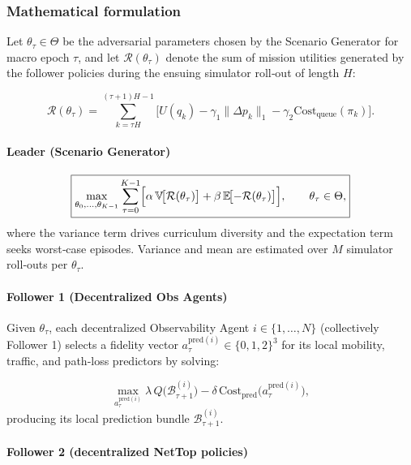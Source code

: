 \documentclass[doc.tex]{subfiles}
\begin{document}
\subsubsection{Mathematical formulation}

Let \(\theta_\tau\in\Theta\) be the adversarial parameters chosen by the
Scenario Generator for macro epoch \(\tau\), and let  \(\mathcal{R}(\theta_\tau)\) denote the sum of mission utilities
generated by the follower policies during the ensuing simulator
roll‑out of length \(H\):

\[
  \mathcal{R}(\theta_\tau)=\sum_{k=\tau H}^{(\tau+1)H-1}\bigl[U(q_k)-\gamma_1\|\Delta p_k\|_1-\gamma_2 \mathrm{Cost}_{\text{queue}}(\pi_k)\bigr].
\]

\vspace{0.4em}
\paragraph{Leader (Scenario Generator)}

\[
\boxed{
  \max_{\theta_0,\dots,\theta_{K-1}}
      \sum_{\tau=0}^{K-1}
        \Bigl[
          \alpha\,\mathbb{V}\!\bigl[\mathcal{R}(\theta_\tau)\bigr]
          +\beta\,\mathbb{E}\!\bigl[-\mathcal{R}(\theta_\tau)\bigr]
        \Bigr],
  \qquad
  \theta_\tau\in\Theta,
}
\]
where the variance term drives curriculum diversity and the expectation
term seeks worst‑case episodes. Variance and mean are estimated over \(M\) simulator roll‑outs per \(\theta_\tau\).

\vspace{0.4em}
\paragraph{Follower 1 (Decentralized Obs Agents)} 

Given \(\theta_\tau\), each decentralized Observability Agent $i \in \{1, \dots, N\}$ (collectively Follower 1) selects a fidelity vector
\(a_\tau^{\text{pred}(i)}\in\{0,1,2\}^3\) for its local mobility, traffic, and
path‑loss predictors by solving: 

\[
\boxed{
  \max_{a_\tau^{\text{pred}(i)}}
    \lambda\,Q\!\bigl(\mathcal{B}_{\tau+1}^{(i)}\bigr) 
    -\delta\,\mathrm{Cost}_{\text{pred}}\!\bigl(a_\tau^{\text{pred}(i)}\bigr), 
}
\]
producing its local prediction bundle \(\mathcal{B}_{\tau+1}^{(i)}\).

\vspace{0.4em}
\paragraph{Follower 2 (decentralized NetTop policies)}
\end{document}
